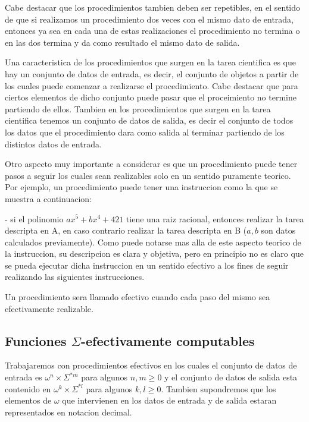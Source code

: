 Cabe destacar que los procedimientos tambien deben ser repetibles, en el sentido de que si realizamos un procedimiento dos veces con el mismo dato de entrada, entonces ya sea en cada una de estas realizaciones el procedimiento no termina o en las dos termina y da como resultado el mismo dato de salida.

Una caracteristica de los procedimientos que surgen en la tarea cientifica es que hay un conjunto de datos de entrada, es decir, el conjunto de objetos a partir de los cuales puede comenzar a realizarse el procedimiento. Cabe destacar que para ciertos elementos de dicho conjunto puede pasar que el proceimiento no termine partiendo de ellos. Tambien en los procedimientos que surgen en la tarea cientifica tenemos un conjunto de datos de salida, es decir el conjunto de todos los datos que el procedimiento dara como salida al terminar partiendo de los distintos datos de entrada.

Otro aspecto muy importante a considerar es que un procedimiento puede tener pasos a seguir los cuales sean realizables solo en un sentido puramente teorico. Por ejemplo, un procedimiento puede tener una instruccion como la que se muestra a continuacion:

- si el polinomio \(ax^{5}+bx^{4}+421\) tiene una raiz racional, entonces realizar la tarea descripta en A, en caso contrario realizar la tarea descripta en B
(\(a,b\) son datos calculados previamente). Como puede notarse mas alla de este aspecto teorico de la instruccion, su descripcion es clara y objetiva, pero en principio no es claro que se pueda ejecutar dicha instruccion en un sentido efectivo a los fines de seguir realizando las siguientes instrucciones.

Un procedimiento sera llamado efectivo cuando cada paso del mismo sea efectivamente realizable.

\subsection{Funciones \(\Sigma \)-efectivamente computables}

Trabajaremos con procedimientos efectivos en los cuales el conjunto de datos de entrada es \(\omega ^{n}\times \Sigma ^{\ast m}\) para algunos \(n,m\geq 0\) y el conjunto de datos de salida esta contenido en \(\omega ^{k}\times \Sigma ^{\ast l}\) para algunos \(k,l\geq 0\). Tambien supondremos que los elementos de \(\omega \) que intervienen en los datos de entrada y de salida estaran representados en notacion decimal.

